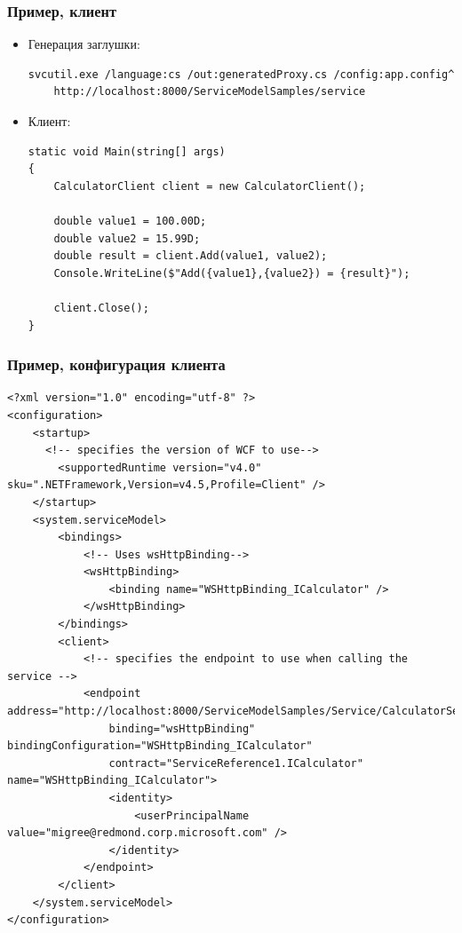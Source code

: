 \documentclass[xetex,mathserif,serif]{beamer}
\begin{document}
    \begin{frame}[fragile]
        \frametitle{Пример, клиент}
        \begin{itemize}
            \item Генерация заглушки: 
                \begin{scriptsize}
                    \begin{verbatim}
svcutil.exe /language:cs /out:generatedProxy.cs /config:app.config^
    http://localhost:8000/ServiceModelSamples/service
                    \end{verbatim}
                \end{scriptsize}
            \item Клиент:
                \begin{footnotesize}
                    \begin{verbatim}
static void Main(string[] args)
{
    CalculatorClient client = new CalculatorClient();

    double value1 = 100.00D;
    double value2 = 15.99D;
    double result = client.Add(value1, value2);
    Console.WriteLine($"Add({value1},{value2}) = {result}");

    client.Close();
}
                    \end{verbatim}
                \end{footnotesize}
        \end{itemize}
    \end{frame}

    \begin{frame}[fragile]
        \frametitle{Пример, конфигурация клиента}
        \begin{ssmall}
            \begin{verbatim}
<?xml version="1.0" encoding="utf-8" ?>  
<configuration>  
    <startup>   
      <!-- specifies the version of WCF to use-->  
        <supportedRuntime version="v4.0" sku=".NETFramework,Version=v4.5,Profile=Client" />  
    </startup>  
    <system.serviceModel>  
        <bindings>  
            <!-- Uses wsHttpBinding-->  
            <wsHttpBinding>  
                <binding name="WSHttpBinding_ICalculator" />  
            </wsHttpBinding>  
        </bindings>  
        <client>  
            <!-- specifies the endpoint to use when calling the service -->  
            <endpoint address="http://localhost:8000/ServiceModelSamples/Service/CalculatorService"  
                binding="wsHttpBinding" bindingConfiguration="WSHttpBinding_ICalculator"  
                contract="ServiceReference1.ICalculator" name="WSHttpBinding_ICalculator">  
                <identity>  
                    <userPrincipalName value="migree@redmond.corp.microsoft.com" />  
                </identity>  
            </endpoint>  
        </client>  
    </system.serviceModel>  
</configuration>
            \end{verbatim}
        \end{ssmall}
    \end{frame}
\end{document}
